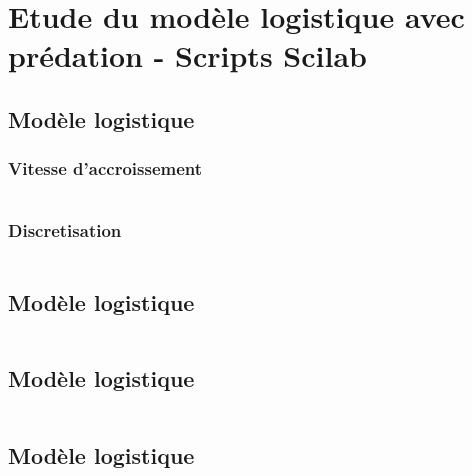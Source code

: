 \documentclass{article}
\begin{document}
\section{Etude du modèle logistique avec prédation - Scripts Scilab}

\subsection{Modèle logistique}

\subsubsection{Vitesse d'accroissement}

\begin{verbatim}
\end{verbatim}

\subsubsection{Discretisation}

\begin{verbatim}
\end{verbatim}

\subsection{Modèle logistique}

\begin{verbatim}
\end{verbatim}

\subsection{Modèle logistique}

\begin{verbatim}
\end{verbatim}

\subsection{Modèle logistique}

\begin{verbatim}
\end{verbatim}
\end{document}
